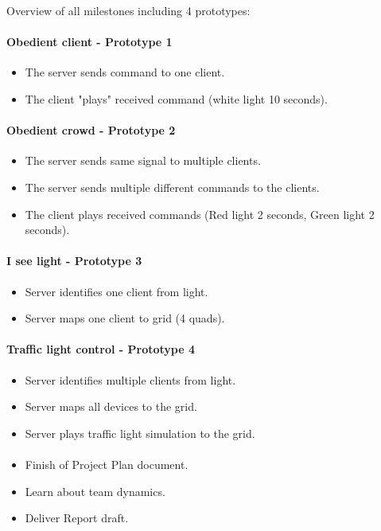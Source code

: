  
Overview of all milestones including 4 prototypes:

\paragraph{Obedient client  - Prototype 1}
\begin{itemize}
	\item The server sends command to one client.
	\item The client "plays" received command (white light 10 seconds).
\end{itemize}

\paragraph{Obedient crowd - Prototype 2}
\begin{itemize}
	\item The server sends same signal to multiple clients.
	\item The server sends multiple different commands to the clients.
	\item The client plays received commands (Red light 2 seconds, Green light 2 seconds).
\end{itemize}

\paragraph{I see light - Prototype 3}
\begin{itemize}
	\item Server identifies one client from light.
	\item Server maps one client to grid (4 quads).
\end{itemize}

\paragraph{Traffic light control - Prototype 4}
\begin{itemize}
	\item Server identifies multiple clients from light.
	\item Server maps all devices to the grid.
	\item Server plays traffic light simulation to the grid.
\end{itemize}

\paragraph{}
\begin{itemize}
	\item Finish of Project Plan document.
	\item Learn about team dynamics.
	\item Deliver Report draft.
\end{itemize}

